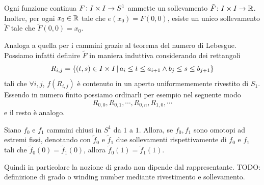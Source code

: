 \documentclass[a4paper]{article}
\begin{document}
\begin{snippetproposition}{}
    Ogni funzione continua \(F \colon I \times I \to S^1\)
    ammette un sollevamento \(\tilde F \colon I \times I \to \mathbb{R}\).
    Inoltre, per ogni \(x_0 \in \mathbb{R}\) tale che \(e(x_0) = F(0,0)\),
    esiste un unico sollevamento \(\tilde F\) tale che \(\tilde F(0,0) = x_0\).
\end{snippetproposition}

\begin{snippetproof}{}
    Analoga a quella per i cammini
    grazie al teorema del numero di Lebesgue.
    Possiamo infatti definire \(\tilde F\) in maniera induttiva considerando dei rettangoli
    \[
        R_{i,j} = \{(t,s) \in I \times I \,|\, a_i \leq t \leq a_{i+1} \land b_j \leq s \leq b_{j+1}\}
    \]
    tali che \(\forall i,j\), \(f(R_{i,j})\) è contenuto in un aperto uniformememente rivestito
    di \(S_1\).
    Essendo in numero finito possiamo ordinarli per esempio nel seguente modo
    \[
        R_{0,0}, R_{0,1}, \cdots, R_{0,n}, R_{1,0}, \cdots
    \]
    e il resto è analogo.
\end{snippetproof}

\begin{snippetcorollary}{}
    Siano \(f_0\) e \(f_1\)
    cammini chiusi in \(S^1\) da \(1\) a \(1\).
    Allora, se \(f_0, f_1\) sono omotopi ad estremi fissi,
    denotando con \(\tilde f_0\) e \(\tilde f_1\) due sollevamenti rispettivamente di
    \(f_0\) e \(f_1\) tali che
    \(\tilde f_0(0) = \tilde f_1(0)\), allora \(\tilde f_0(1) = \tilde f_1(1)\).
\end{snippetcorollary}

Quindi in particolare la nozione di grado non dipende dal rappresentante.
TODO: definizione di grado o winding number mediante rivestimento e sollevamento.
\end{document}

